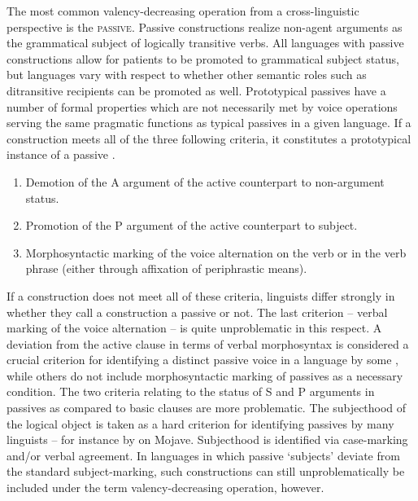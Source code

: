The most common valency-decreasing operation from a cross-linguistic perspective is the \textsc{passive}. 
Passive constructions realize non-agent arguments as the grammatical subject of logically transitive verbs. 
All languages with passive constructions allow for patients to be promoted to grammatical subject status, but languages vary with respect to whether other semantic roles such as ditransitive recipients can be promoted as well. 
Prototypical {passives} have a number of formal properties which are not necessarily met by voice operations serving the same pragmatic functions as typical passives in a given language. 
If a construction meets all of the three following criteria, it constitutes a prototypical instance of a passive \citep[205]{WALS107, Payne:1997}.

\begin{enumerate}
\item Demotion of the A argument of the active counterpart to non-argument status.
\item Promotion of the P argument of the active counterpart to subject.
\item Morphosyntactic marking of the voice alternation on the verb or in the verb phrase (either through affixation of periphrastic means).
\end{enumerate}

If a construction does not meet all of these criteria, linguists differ strongly in whether they call a construction a passive or not. 
The last criterion -- verbal marking of the voice alternation -- is quite unproblematic in this respect. A deviation from the active clause in terms of verbal morphosyntax is considered a crucial criterion for identifying a distinct passive voice in a language  by some \citep{WALS107},
while others \citep{Haspelmath:1990,Dryer:1982} do not include morphosyntactic marking of passives as a necessary condition. 
The two criteria relating to the status of S and P arguments in passives as compared to basic clauses are more problematic. 
The subjecthood of the logical object is taken as a hard criterion for identifying passives by many linguists -- for instance by \citet{Munro:1976} on Mojave. 
Subjecthood is identified via case-marking and/or verbal agreement. In languages in which passive `subjects' deviate from the
standard subject-marking, such constructions can still unproblematically be included under the term valency-decreasing operation, however.

